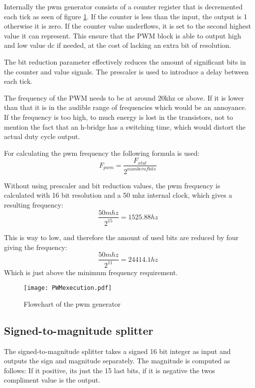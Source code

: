 Internally the pwm generator consists of a counter register that is decremented each tick as seen of figure \ref{fig:pwmchart}. If the counter is less than the input, the output is 1 otherwise it is zero.
If the counter value underflows, it is set to the second highest value it can represent. This ensure that the PWM block is able to output high and low value dc if needed, at the cost of lacking an extra bit of resolution.

The bit reduction parameter effectively reduces the amount of significant bits in the counter and value signals.
The prescaler is used to introduce a delay between each tick.

The frequency of the PWM needs to be at around 20khz or above. If it is lower than that it is in the audible range of frequencies which would be an annoyance. If the frequency is too high, to much energy is lost in the transistors, not to mention the fact that an h-bridge has a switching time, which would distort the actual duty cycle output.

For calculating the pwm frequency the following formula is used: 
\begin{equation}
F_{pwm} = \frac{F_{xtal}}{2^{number of bits}}
\end{equation}

Without using prescaler and bit reduction values, the pwm frequency is calculated with 16 bit resolution and a 50 mhz internal clock, which gives a resulting frequency:
\begin{equation}
\frac{50 mhz}{2^{15}} = 1525.88 hz
\end{equation}

This is way to low, and therefore the amount of used bits are reduced by four giving the frequency:
\begin{equation}
\frac{50 mhz}{2^{11}} = 24414.1 hz
\end{equation}
Which is just above the minimum frequency requirement.

\begin{figure}[htb]
\texttt{[image: PWMexecution.pdf]}
\caption{Flowchart of the pwm generator}
\label{fig:pwmchart}
\end{figure}

\subsection{Signed-to-magnitude splitter}
The signed-to-magnitude splitter takes a signed 16 bit integer as input and outputs the sign and magnitude separately.
The magnitude is computed as follows:
If it positive, its just the 15 last bits, if it is negative the twos compliment value is the output.

